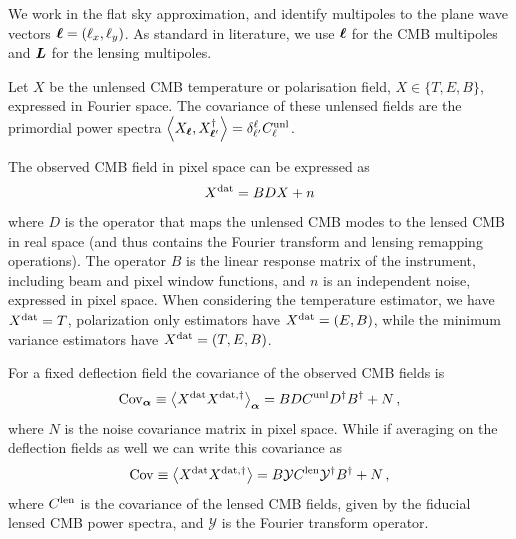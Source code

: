 \documentclass[prd, superscriptaddress, tightenlines, longbibliography, nofootinbib, eqsecnum, amsfonts, amsmath, floatfix, twocolumn, notitlepage]{revtex4-2}
\newcommand{\Cov}[0]{ {\rm{Cov}} }
\begin{document}
We work in the flat sky approximation, and identify multipoles to the plane wave vectors ${\boldsymbol{\ell}} = (\ell_x, \ell_y)$.
As standard in literature, we use ${\boldsymbol{\ell}}$ for the CMB multipoles and ${\mbox{\boldmath{$L$}}}$ for the lensing multipoles.   

Let $X$ be the unlensed CMB temperature or polarisation field, $X \in \{T, E, B\}$, expressed in Fourier space.
The covariance of these unlensed fields are the primordial power spectra 
$\left<X_{{\boldsymbol{\ell}}}, X_{{\boldsymbol{\ell}}'}^\dagger \right> = \delta^{\ell}_{\ell'} C_\ell^{\rm unl}$.

The observed CMB field in pixel space can be expressed as 
\begin{equation}
    X^{\rm dat} = BDX + n
\end{equation}
where $D$ is the operator that maps the unlensed CMB modes to the lensed CMB in real space (and thus contains the Fourier transform and lensing remapping operations). The operator $B$ is the linear response matrix of the instrument, including beam and pixel window functions, and $n$ is an independent noise, expressed in pixel space.
When considering the temperature estimator, we have $ X^{\rm dat} = T$, polarization only estimators have $ X^{\rm dat} = (E, B)$, while the minimum variance estimators have  $X^{\rm dat} = (T, E, B)$.

For a fixed deflection field the covariance of the observed CMB fields is
\begin{equation}
    \Cov_{\valpha} \equiv \left<X^{\rm dat} X^{\rm dat, \dagger} \right>_{\valpha}  = BDC^{\rm unl} D^\dagger B^\dagger + N \, ,
\end{equation}
where $N$ is the noise covariance matrix in pixel space. 
While if averaging on the deflection fields as well we can write this covariance as 
\begin{equation}
    \Cov \equiv \left<X^{\rm dat} X^{\rm dat, \dagger} \right> = B \mathcal{Y} C^{\rm len} \mathcal{Y}^\dagger B^\dagger + N \, ,
\end{equation}
where $C^{\rm len}$ is the covariance of the lensed CMB fields, given by the fiducial lensed CMB power spectra, and $\mathcal{Y}$ is the Fourier transform operator.
\end{document}
